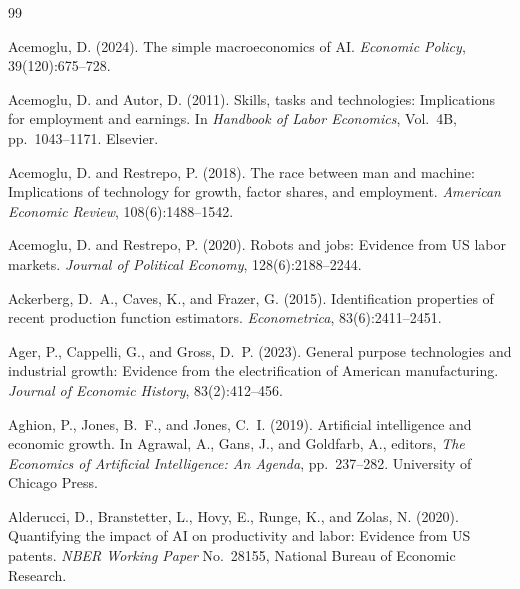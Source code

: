 \documentclass[11pt,a4paper]{article}
\begin{document}
\clearpage
\begin{thebibliography}{99}
\setlength{\itemsep}{2pt}

Acemoglu, D. (2024).
\newblock The simple macroeconomics of AI.
\newblock \emph{Economic Policy}, 39(120):675--728.

Acemoglu, D. and Autor, D. (2011).
\newblock Skills, tasks and technologies: Implications for employment and earnings.
\newblock In \emph{Handbook of Labor Economics}, Vol.~4B, pp.~1043--1171. Elsevier.

Acemoglu, D. and Restrepo, P. (2018).
\newblock The race between man and machine: Implications of technology for growth, factor shares, and employment.
\newblock \emph{American Economic Review}, 108(6):1488--1542.

Acemoglu, D. and Restrepo, P. (2020).
\newblock Robots and jobs: Evidence from US labor markets.
\newblock \emph{Journal of Political Economy}, 128(6):2188--2244.

Ackerberg, D.~A., Caves, K., and Frazer, G. (2015).
\newblock Identification properties of recent production function estimators.
\newblock \emph{Econometrica}, 83(6):2411--2451.

Ager, P., Cappelli, G., and Gross, D.~P. (2023).
\newblock General purpose technologies and industrial growth: Evidence from the electrification of American manufacturing.
\newblock \emph{Journal of Economic History}, 83(2):412--456.

Aghion, P., Jones, B.~F., and Jones, C.~I. (2019).
\newblock Artificial intelligence and economic growth.
\newblock In Agrawal, A., Gans, J., and Goldfarb, A., editors, \emph{The Economics of Artificial Intelligence: An Agenda}, pp.~237--282. University of Chicago Press.

Alderucci, D., Branstetter, L., Hovy, E., Runge, K., and Zolas, N. (2020).
\newblock Quantifying the impact of AI on productivity and labor: Evidence from US patents.
\newblock \emph{NBER Working Paper} No.~28155, National Bureau of Economic Research.


\end{thebibliography}
\end{document}
